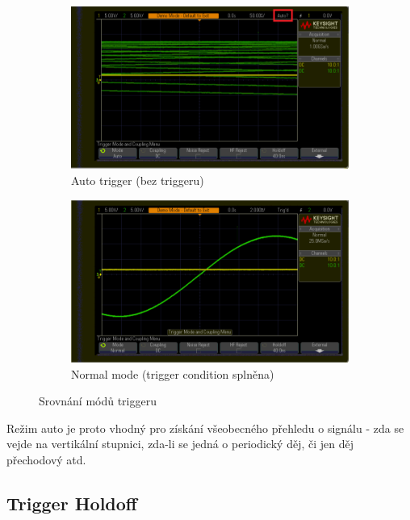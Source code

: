\documentclass[twoside]{article}
\begin{document}
\begin{figure}[htbp]
	\centering
	\begin{subfigure}{0.45\textwidth}
		\includegraphics[width=\linewidth]{trigger_auto.png                      }
		\caption{Auto trigger (bez triggeru)}
	\end{subfigure}
	\begin{subfigure}{0.45\textwidth}
		\includegraphics[width=\linewidth]{trigger_normal.png                    }
		\caption{Normal mode (trigger condition splněna)}
	\end{subfigure}
	\caption{Srovnání módů triggeru}
	\label{fig:trigger_mode}
\end{figure}

Režim auto je proto vhodný pro získání všeobecného přehledu o signálu - zda se vejde na vertikální
stupnici, zda-li se jedná o periodický děj, či jen děj přechodový atd.

\subsection{Trigger Holdoff}
\end{document}
